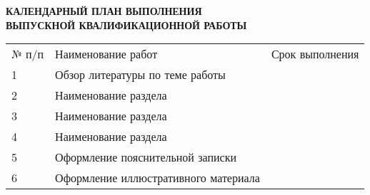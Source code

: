\begin{center}
	\textbf{
		КАЛЕНДАРНЫЙ ПЛАН ВЫПОЛНЕНИЯ \\
		ВЫПУСКНОЙ КВАЛИФИКАЦИОННОЙ РАБОТЫ
	}

	\vspace*{2cm}

	\confirmation

	\vspace*{3cm}
	
	\worktitle

	\vspace*{4cm}
	
	\begin{tabularx}{\textwidth}{ l X l }
		№ п/п & Наименование работ & Срок выполнения \\
		1 & Обзор литературы по теме работы & \\
		2 & Наименование раздела & \\
		3 & Наименование раздела & \\
		4 & Наименование раздела & \\
		5 & Оформление пояснительной записки & \\
		6 & Оформление иллюстративного материала & \\
	\end{tabularx}

	\vspace*{3.5cm}

	\subsblock
\end{center}

\thispagestyle{empty}
\clearpage
